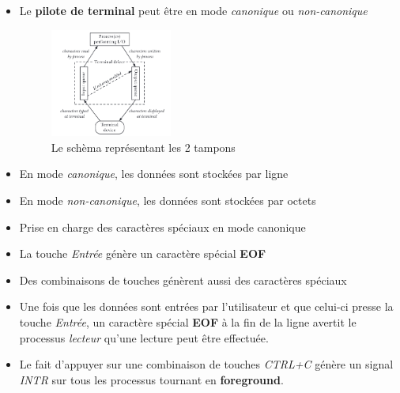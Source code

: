 \begin{frame}
	\begin{itemize}[<+->]
		\item Le \textbf{pilote de terminal} peut être en mode \textit{canonique} ou \textit{non-canonique}
			\begin{figure}
				\centering
				\includegraphics[width=4cm]{images/input_output_queue.png}
				\caption{Le schèma représentant les 2 tampons}
			\end{figure}
		\item En mode \textit{canonique}, les données sont stockées par ligne
		
		\item En mode \textit{non-canonique}, les données sont stockées par octets
	\end{itemize}
\end{frame}

\begin{frame}
	\begin{itemize}[<+->]
		\item Prise en charge des caractères spéciaux en mode canonique

		\item La touche \textit{Entrée} génère un caractère spécial \textbf{EOF}

		\item Des combinaisons de touches génèrent aussi des caractères spéciaux

	\end{itemize}

	\begin{examples}
		\begin{itemize}[<+->]
			\item Une fois que les données sont entrées par l'utilisateur et que celui-ci presse la touche \textit{Entrée}, un caractère spécial \textbf{EOF} à la fin de la ligne avertit le processus \textit{lecteur} qu'une lecture peut être effectuée.
			\item Le fait d'appuyer sur une combinaison de touches \textit{CTRL+C} génère un signal \textit{INTR} sur tous les processus tournant en \textbf{foreground}.
		\end{itemize}
	\end{examples}
\end{frame}

